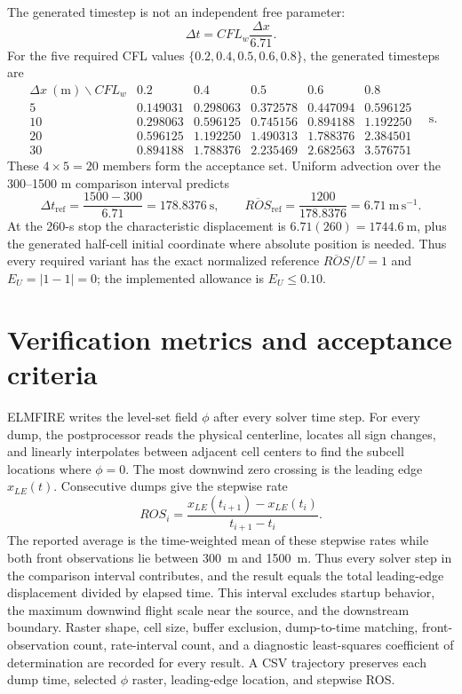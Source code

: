 The generated timestep is not an independent free parameter:
\[
 \Delta t=CFL_w\frac{\Delta x}{6.71}.
\]
For the five required CFL values \(\{0.2,0.4,0.5,0.6,0.8\}\), the generated
timesteps are
\[
\begin{array}{c|ccccc}
\Delta x~(\mathrm{m})\backslash CFL_w&0.2&0.4&0.5&0.6&0.8\\\hline
5&0.149031&0.298063&0.372578&0.447094&0.596125\\
10&0.298063&0.596125&0.745156&0.894188&1.192250\\
20&0.596125&1.192250&1.490313&1.788376&2.384501\\
30&0.894188&1.788376&2.235469&2.682563&3.576751
\end{array}
\quad\mathrm{s}.
\]
These \(4\times5=20\) members form the acceptance set.  Uniform advection over
the 300--1500 m comparison interval predicts
\[
 \Delta t_{\mathrm{ref}}=\frac{1500-300}{6.71}=178.8376~\mathrm{s},
 \qquad \overline{ROS}_{\mathrm{ref}}
 =\frac{1200}{178.8376}=6.71~\mathrm{m\,s^{-1}}.
\]
At the 260-s stop the characteristic displacement is
\(6.71(260)=1744.6~\mathrm{m}\), plus the generated half-cell initial
coordinate where absolute position is needed.  Thus every required variant
has the exact normalized reference
\(\overline{ROS}/U=1\) and \(E_U=|1-1|=0\); the implemented allowance is
\(E_U\leq0.10\).

\section{Verification metrics and acceptance criteria}
ELMFIRE writes the level-set field \(\phi\) after every solver time step.
For every dump, the postprocessor reads the physical centerline, locates all
sign changes, and linearly interpolates between adjacent cell centers to find
the subcell locations where \(\phi=0\).  The most downwind zero crossing is
the leading edge \(x_{LE}(t)\).  Consecutive dumps give the stepwise rate
\begin{equation}
  ROS_i = \frac{x_{LE}(t_{i+1})-x_{LE}(t_i)}{t_{i+1}-t_i}.
\end{equation}
The reported average is the time-weighted mean of these stepwise rates while
both front observations lie between \SI{300}{m} and \SI{1500}{m}.  Thus every
solver step in the comparison interval contributes, and the result equals
the total leading-edge displacement divided by elapsed time.  This interval
excludes startup behavior, the maximum downwind flight scale near the source,
and the downstream boundary.  Raster shape, cell size, buffer exclusion,
dump-to-time matching, front-observation count, rate-interval count, and a
diagnostic least-squares coefficient of determination are recorded for every
result.  A CSV trajectory preserves each dump time, selected \(\phi\) raster,
leading-edge location, and stepwise ROS.

